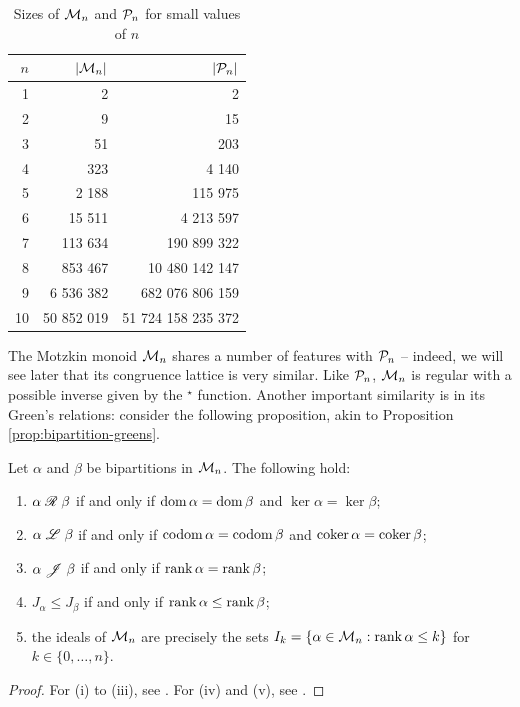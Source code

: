 \begin{table}[ht]
  \centering
  \renewcommand\arraystretch{1.0}
  \begin{tabular}{| r | r | r |}
    \hline
    $n$ & $|\mathcal{M}_n|$ & $|\mathcal{P}_n|$ \\
    \hline
     1 &           2 &                  2 \\
     2 &           9 &                 15 \\
     3 &          51 &                203 \\
     4 &         323 &              4 140 \\
     5 &       2 188 &            115 975 \\
     6 &      15 511 &          4 213 597 \\
     7 &     113 634 &        190 899 322 \\
     8 &     853 467 &     10 480 142 147 \\
     9 &   6 536 382 &    682 076 806 159 \\
    10 &  50 852 019 & 51 724 158 235 372 \\
    \hline
  \end{tabular}
  \renewcommand\arraystretch{0.7}
  \caption{Sizes of $\mathcal{M}_n$ and $\mathcal{P}_n$ for small values of $n$}
  \label{tab:mn-size}
\end{table}

The Motzkin monoid $\mathcal{M}_n$ shares a number of features with $\mathcal{P}_n$ -- indeed,
we will see later that its congruence lattice is very similar.  Like $\mathcal{P}_n$,
$\mathcal{M}_n$ is regular with a possible inverse given by the $^\star$
function. Another important similarity is in its Green's relations: consider the
following proposition, akin to Proposition \ref{prop:bipartition-greens}.

\begin{proposition}
  \label{prop:mn-greens}
  Let $\alpha$ and $\beta$ be bipartitions in $\mathcal{M}_n$.  The following hold:
  \begin{enumerate}[\rm(i)]
  \item $\alpha \mathrel{\mathscr{R}} \beta$ if and only if $\operatorname{dom} \alpha = \operatorname{dom} \beta$ and
    $\ker \alpha = \ker \beta$;
  \item $\alpha \mathrel{\mathscr{L}} \beta$ if and only if $\operatorname{codom} \alpha = \operatorname{codom} \beta$ and
    $\operatorname{coker} \alpha = \operatorname{coker} \beta$;
  \item $\alpha \mathrel{\mathscr{J}} \beta$ if and only if $\operatorname{rank} \alpha = \operatorname{rank} \beta$;
  \item $J_\alpha \leq J_\beta$ if and only if $\operatorname{rank} \alpha \leq \operatorname{rank} \beta$;
  \item the ideals of $\mathcal{M}_n$ are precisely the sets
    $I_k=\{\alpha \in \mathcal{M}_n : \operatorname{rank} \alpha \leq k\}$ for
    $k \in \{0, \ldots, n\}$.
  \end{enumerate}
  \begin{proof}
    For (i) to (iii), see \cite[Theorem 2.4]{deg_motzkin}.  For (iv) and (v),
    see \cite[Proposition 2.6]{deg_motzkin}.
  \end{proof}
\end{proposition}


